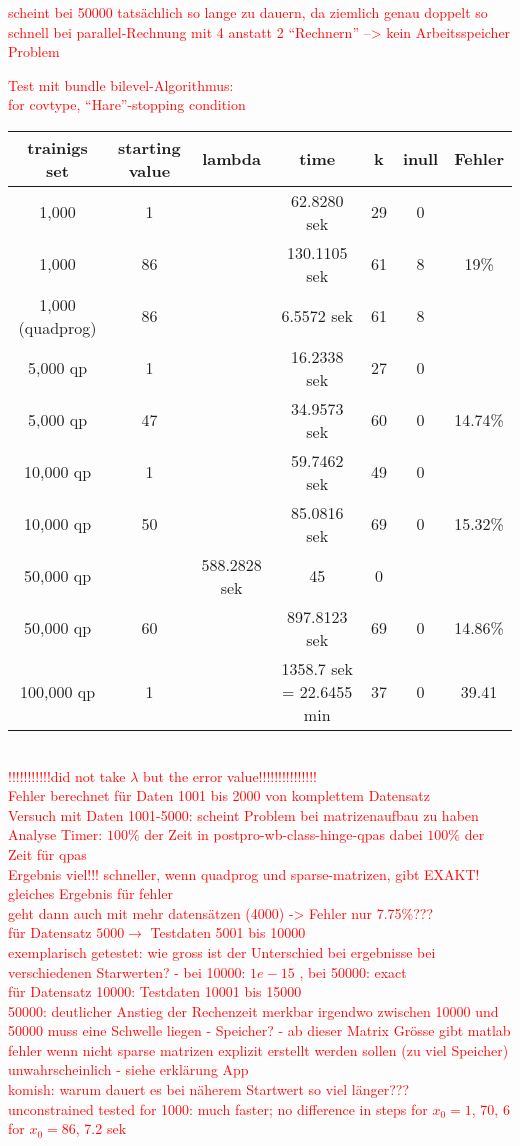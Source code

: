 \textcolor{red}{scheint bei 50000 tats\"achlich so lange zu dauern, da ziemlich genau doppelt so schnell bei parallel-Rechnung mit 4 anstatt 2 ``Rechnern'' --> kein Arbeitsspeicher Problem}

\textcolor{red}{Test mit bundle bilevel-Algorithmus:\\
for covtype, ``Hare''-stopping condition\\
\begin{tabular}{c|c|c|c|c|c|c}
trainigs set & starting value & lambda & time & k & inull & Fehler\\
\hline
1,000 & 1 &  & 62.8280 sek & 29 & 0 & \\
1,000 & 86 &  & 130.1105 sek & 61 & 8 & 19\% \\
1,000 (quadprog) & 86 & & 6.5572 sek & 61 & 8 & \\
5,000 qp & 1 &  & 16.2338 sek & 27 & 0 & \\
5,000 qp & 47 &  & 34.9573 sek & 60 & 0 & 14.74\% \\
10,000 qp & 1 &  & 59.7462 sek & 49 & 0 & \\
10,000 qp & 50 &  & 85.0816 sek & 69 & 0 & 15.32\% \\
50,000 qp &  & 588.2828 sek & 45 & 0 & \\
50,000 qp & 60 &  & 897.8123 sek & 69 & 0 & 14.86\% \\
100,000 qp & 1 &  & 1358.7 sek = 22.6455 min & 37 & 0 & 39.41
\end{tabular}
\\
!!!!!!!!!!!did not take \(\lambda\) but the error value!!!!!!!!!!!!!!!\\
Fehler berechnet f\"ur Daten 1001 bis 2000 von komplettem Datensatz\\
Versuch mit Daten 1001-5000: scheint Problem bei matrizenaufbau zu haben \\
Analyse Timer: \(100\%\) der Zeit in postpro-wb-class-hinge-qpas dabei \(100\%\) der Zeit für qpas\\
Ergebnis viel!!! schneller, wenn quadprog und sparse-matrizen, gibt EXAKT! gleiches Ergebnis für fehler\\
geht dann auch mit mehr datens\"atzen (4000) -> Fehler nur 7.75\%??? \\
f\"ur Datensatz \( 5000 \to\) Testdaten 5001 bis 10000 \\
exemplarisch getestet: wie gross ist der Unterschied bei ergebnisse bei verschiedenen Starwerten? - bei 10000: \(1e-15\) , bei 50000: exact\\
f\"ur Datensatz 10000: Testdaten 10001 bis 15000 \\
50000: deutlicher Anstieg der Rechenzeit merkbar irgendwo zwischen 10000 und 50000 muss eine Schwelle liegen - Speicher? - ab dieser Matrix Gr\"osse gibt matlab fehler wenn nicht sparse matrizen explizit erstellt werden sollen (zu viel Speicher) unwahrscheinlich - siehe erkl\"arung App \\
komish: warum dauert es bei n\"aherem Startwert so viel l\"anger??? \\
unconstrained tested for 1000: much faster; no difference in steps for \(x_0 = 1\), 70, 6 for \(x_0=86\), 7.2 sek}

